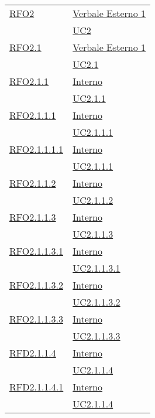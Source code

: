 \begin{longtable}{|>{\centering}m{5cm}|m{5cm}<{\centering}|}
\hyperlink{RFO2}{RFO2} & \hyperlink{Verbale Esterno 1}{Verbale Esterno 1}\\
& \hyperref[UC2]{UC2}\\ \hline

\hyperlink{RFO2.1}{RFO2.1} & \hyperlink{Verbale Esterno 1}{Verbale Esterno 1}\\
& \hyperref[UC2.1]{UC2.1}\\ \hline

\hyperlink{RFO2.1.1}{RFO2.1.1} & \hyperlink{Interno}{Interno}\\
& \hyperref[UC2.1.1]{UC2.1.1}\\ \hline

\hyperlink{RFO2.1.1.1}{RFO2.1.1.1} & \hyperlink{Interno}{Interno}\\
& \hyperref[UC2.1.1.1]{UC2.1.1.1}\\ \hline

\hyperlink{RFO2.1.1.1.1}{RFO2.1.1.1.1} & \hyperlink{Interno}{Interno}\\
& \hyperref[UC2.1.1.1]{UC2.1.1.1}\\ \hline

\hyperlink{RFO2.1.1.2}{RFO2.1.1.2} & \hyperlink{Interno}{Interno}\\
& \hyperref[UC2.1.1.2]{UC2.1.1.2}\\ \hline

\hyperlink{RFO2.1.1.3}{RFO2.1.1.3} & \hyperlink{Interno}{Interno}\\
& \hyperref[UC2.1.1.3]{UC2.1.1.3}\\ \hline

\hyperlink{RFO2.1.1.3.1}{RFO2.1.1.3.1} & \hyperlink{Interno}{Interno}\\
& \hyperref[UC2.1.1.3.1]{UC2.1.1.3.1}\\ \hline

\hyperlink{RFO2.1.1.3.2}{RFO2.1.1.3.2} & \hyperlink{Interno}{Interno}\\
& \hyperref[UC2.1.1.3.2]{UC2.1.1.3.2}\\ \hline

\hyperlink{RFO2.1.1.3.3}{RFO2.1.1.3.3} & \hyperlink{Interno}{Interno}\\
& \hyperref[UC2.1.1.3.3]{UC2.1.1.3.3}\\ \hline

\hyperlink{RFD2.1.1.4}{RFD2.1.1.4} & \hyperlink{Interno}{Interno}\\
& \hyperref[UC2.1.1.4]{UC2.1.1.4}\\ \hline

\hyperlink{RFD2.1.1.4.1}{RFD2.1.1.4.1} & \hyperlink{Interno}{Interno}\\
& \hyperref[UC2.1.1.4]{UC2.1.1.4}\\ \hline


\end{longtable}
